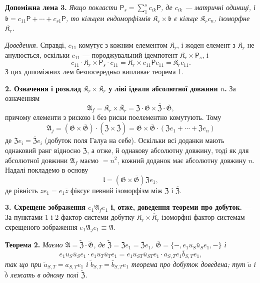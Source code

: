 \documentclass[11pt]{article}
\begin{document}
\noindent\textbf{Допоміжна лема 3.} \emph{Якщо покласти \(\mathsf{P}_s=\sum_1^s c_{ik}\mathsf{P}\), де \(c_{ik}\) --- матричні одиниці, і \(\mathfrak b=c_{11}\mathsf{P}+\cdots+c_{s1}\mathsf{P}\), то кільцем ендоморфізмів \(\mathfrak K_r\times\mathfrak b\) є кільце \(\mathfrak K_rc_n\), ізоморфне \(\mathfrak K_r\).}

\noindent\emph{Доведення.} Справді, \(c_{11}\) комутує з кожним елементом \(\mathfrak K_r\), і жоден елемент з \(\mathfrak K_r\) не анулюється, оскільки \(c_{11}\) --- породжувальний ідемпотент \(\mathfrak K_r\times \mathsf{P}_s\), і
\[
c_{11}\cdot\mathfrak K_r\times \mathsf{P}_s\cdot c_{11}
=\mathfrak K_r\times c_{11}\mathsf Pc_{11}
=\mathfrak K_rc_{11}.
\]
З цих допоміжних лем безпосередньо випливає теорема 1.

\noindent\textbf{2. Означення і розклад \(\mathfrak K_r\times\overline{\mathfrak K}_r\) у ліві ідеали абсолютної довжини \(n\).} За означенням
\[
\mathfrak A_f=\mathfrak K_r\times\overline{\mathfrak K}_r
=\mathfrak Z\cdot\mathfrak G\times\overline{\mathfrak Z}\cdot\overline{\mathfrak G},
\]
причому елементи з рискою і без риски поелементно комутують. Тому
\[
\mathfrak A_j
=(\mathfrak G\times\overline{\mathfrak G})\cdot(\mathfrak Z\times\overline{\mathfrak Z})
=\mathfrak G\times\overline{\mathfrak G}\cdot(\mathfrak Ze_1+\cdots+\mathfrak Ze_n)
\]
де \(\mathfrak Ze_i=\overline{\mathfrak Z}e_i\) (добуток поля Галуа на себе). Оскільки всі доданки мають однаковий ранг відносно \(\mathfrak Z\), а отже, й однакову абсолютну довжину, тоді як для абсолютної довжини \(\mathfrak A_f\) маємо \(=n^2\), кожний доданок має абсолютну довжину \(n\). Надалі покладемо в основу
\[
\mathfrak l=(\mathfrak G\times\overline{\mathfrak G})\mathfrak Ze_1,
\]
де рівність \(ze_1=e_1\bar z\) фіксує певний ізоморфізм між \(\mathfrak Z\) і \(\overline{\mathfrak Z}\).

\noindent\textbf{3. Схрещене зображення \(e_1\mathfrak A_fe_1\) і, отже, доведення теореми про добуток.} --- За пунктами 1 і 2 фактор-системи добутку \(\mathfrak K_r\times\overline{\mathfrak K}_r\) ізоморфні фактор-системам схрещеного зображення \(e_1\mathfrak A_je_1\equiv\mathfrak A\).

\noindent\textbf{Теорема 2.} \emph{Маємо \(\mathfrak A=\widetilde{\mathfrak Z}\cdot\widetilde{\mathfrak G}\), де \(\widetilde{\mathfrak Z}=\mathfrak Ze_1=\overline{\mathfrak Z}e_1\), \(\overline{\mathfrak G}=\{-,e_1u_S\bar u_Se_1,-\}\) і
\[
e_1u_S\bar u_Se_1\cdot e_1u_T\bar u_Te_1
=e_1u_{ST}\bar u_{ST}e_1\cdot a_{S,T}e_1\bar b_{S,T}e_1,
\]
так що при \(\tilde a_{S,T}=a_{S,T}e_1\) і \(\tilde b_{S,T}=\bar b_{S,T}e_1\) теорема про добуток доведена; тут \(\tilde a\) і \(\tilde b\) лежать в одному полі \(\widetilde{\mathfrak Z}\).}
\end{document}
